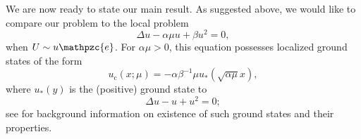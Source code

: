 \documentclass[10pt]{article}
\newcommand{\e}{\mathpzc{e}}
\begin{document}
We are now ready to state our main result. As suggested above, we would like to compare our problem to the local problem 
\begin{equation}\label{e:gs}
\Delta u - \alpha\mu u + \beta u^2=0,
\end{equation}
when $U\sim u{\e}$. For $\alpha\mu>0$, this equation possesses localized ground states of the form 
\begin{equation}\label{e:gs00}
u_\mathrm{c}(x;\mu)=-\alpha\beta^{-1}\mu u_*(\sqrt{\alpha\mu} x),
\end{equation}
where $u_*(y)$ is the (positive) ground state to 
\begin{equation}\label{e:gs0}
\Delta u -  u + u^2=0;
\end{equation}
see \cite{gs} for background information on existence of such ground states and their properties. 
\end{document}
